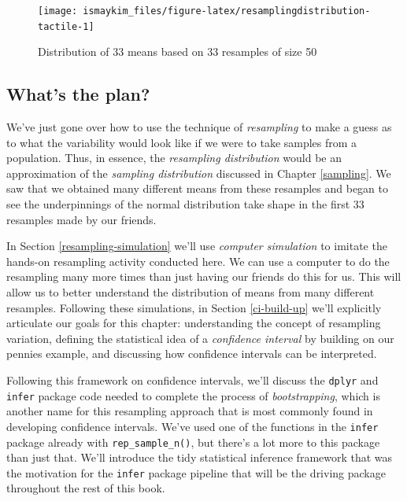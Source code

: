 \documentclass[12pt, krantz2,]{krantz}
\begin{document}
\begin{figure}

{\centering \texttt{[image: ismaykim\_files/figure-latex/resamplingdistribution-tactile-1]} 

}

\caption{Distribution of 33 means based on 33 resamples of size 50}\label{fig:resamplingdistribution-tactile}
\end{figure}

\hypertarget{whats-the-plan}{%
\subsection{What's the plan?}\label{whats-the-plan}}

We've just gone over how to use the technique of \emph{resampling} to make a guess as to what the variability would look like if we were to take samples from a population. Thus, in essence, the \emph{resampling distribution} would be an approximation of the \emph{sampling distribution} discussed in Chapter \ref{sampling}. We saw that we obtained many different means from these resamples and began to see the underpinnings of the normal distribution take shape in the first 33 resamples made by our friends.

In Section \ref{resampling-simulation} we'll use \emph{computer simulation} to imitate the hands-on resampling activity conducted here. We can use a computer to do the resampling many more times than just having our friends do this for us. This will allow us to better understand the distribution of means from many different resamples. Following these simulations, in Section \ref{ci-build-up} we'll explicitly articulate our goals for this chapter: understanding the concept of resampling variation, defining the statistical idea of a \emph{confidence interval} by building on our pennies example, and discussing how confidence intervals can be interpreted.

Following this framework on confidence intervals, we'll discuss the \texttt{dplyr} and \texttt{infer} package code needed to complete the process of \emph{bootstrapping}, which is another name for this resampling approach that is most commonly found in developing confidence intervals. We've used one of the functions in the \texttt{infer} package already with \texttt{rep\_sample\_n()}, but there's a lot more to this package than just that. We'll introduce the tidy statistical inference framework that was the motivation for the \texttt{infer} package pipeline that will be the driving package throughout the rest of this book.
\end{document}
